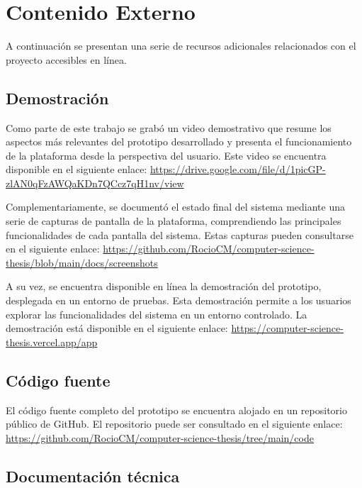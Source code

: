 \chapter[Contenido externo]{Contenido Externo}
\label{cp:annex-content}

\parindent0pt

A continuación se presentan una serie de recursos adicionales relacionados con el proyecto accesibles en línea.

\section{Demostración}
\label{sec:results-demo}

Como parte de este trabajo se grabó un video demostrativo que resume los aspectos más relevantes del prototipo desarrollado y presenta el funcionamiento de la plataforma desde la perspectiva del usuario. Este video se encuentra disponible en el siguiente enlace: 
\url{https://drive.google.com/file/d/1picGP-zlAN0qFzAWQaKDn7QCcz7qH1nv/view}

Complementariamente, se documentó el estado final del sistema mediante una serie de capturas de pantalla de la plataforma, comprendiendo las principales funcionalidades de cada pantalla del sistema. Estas capturas pueden consultarse en el siguiente enlace: \url{https://github.com/RocioCM/computer-science-thesis/blob/main/docs/screenshots}

A su vez, se encuentra disponible en línea la demostración del prototipo, desplegada en un entorno de pruebas. Esta demostración permite a los usuarios explorar las funcionalidades del sistema en un entorno controlado. La demostración está disponible en el siguiente enlace: \url{https://computer-science-thesis.vercel.app/app}

\section{Código fuente}
\label{sec:source-code}

El código fuente completo del prototipo se encuentra alojado en un repositorio público de GitHub. El repositorio puede ser consultado en el siguiente enlace: \url{https://github.com/RocioCM/computer-science-thesis/tree/main/code}

\section{Documentación técnica}
\label{sec:technical-docs}


